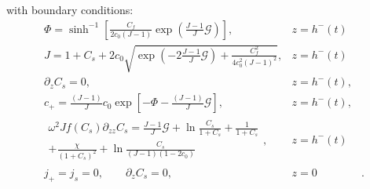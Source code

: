 \documentclass[12pt]{extarticle}
\begin{document}
with boundary conditions:
\begin{eqnarray}
\Phi= \sinh^{-1}\left[\frac{C_f}{2c_0 (J-1)}\exp\left(\frac{J-1}{J}\mathcal{G}\right)\right], & z=h^-(t)&\\[2mm]
J=1+C_{s}+ 2c_0\sqrt{\exp\left(-2\frac{J-1}{J}\mathcal{G}\right)+\frac{C^2_f}{4c^2_0 (J-1)^2}}, & z=h^-(t)&\\[4mm]
\partial_z C_{s}=0,&  z=h^-(t),&\\[5mm]
c_{+} = \frac{(J-1)}{J}c_0\exp\left[-\Phi-\frac{(J-1)}{J}\mathcal{G}\right], &z=h^-(t),&\\
\begin{aligned}
\omega^2 J f(C_s)\partial_{zz} C_s= \frac{J-1}{J} \mathcal{G}  + \ln \frac{C_s}{1+C_{s}} + \frac{1}{1+C_s}\\+\frac{\chi}{(1+C_{s})^2} + \ln \frac{C_s}{(J-1)(1-2c_0)}
\end{aligned}, & z=h^-(t)&\\
j_+= j_s = 0, \qquad \partial_z C_s=0, &z=0&.
\end{eqnarray}
\end{document}
